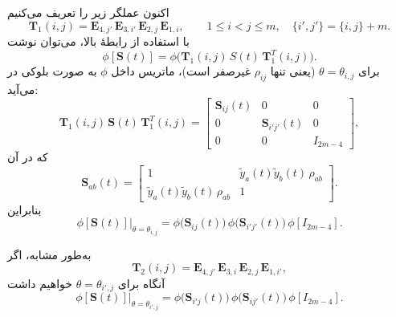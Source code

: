 \begin{اثبات}
	اکنون عملگر زیر را تعریف می‌کنیم
	\[
	\mathbf{T}_1(i,j)=\mathbf{E}_{4,j'}\,\mathbf{E}_{3,i'}\,\mathbf{E}_{2,j}\,\mathbf{E}_{1,i},\qquad 1\le i<j\le m,\quad
	\{i',j'\}=\{i,j\}+m.
	\]
	با استفاده از رابطهٔ بالا، می‌توان نوشت
	\begin{equation}
	\phi[\mathbf{S}(t)]=\phi\!\big(\mathbf{T}_1(i,j)\,S(t)\,\mathbf{T}_1^{T}(i,j)\big).
	\end{equation}
	برای \(\theta=\theta_{i,j}\) (یعنی تنها \(\rho_{ij}\) غیرصفر است)، ماتریس داخل \(\phi\) به صورت بلوکی در می‌آید:
	\begin{equation}
	\mathbf{T}_1(i,j)\,\mathbf{S}(t)\,\mathbf{T}_1^{T}(i,j)=
	\begin{bmatrix}
		\mathbf{S}_{ij}(t) & 0 & 0\\[2pt]
		0 & \mathbf{S}_{i'j'}(t) & 0\\[2pt]
		0 & 0 & I_{2m-4}
	\end{bmatrix},
	\end{equation}
	که در آن
	\begin{equation}
	\mathbf{S}_{ab}(t)=
	\begin{bmatrix}
		1 & \tilde y_a(t)\tilde y_b(t)\,\rho_{ab}\\[2pt]
		\tilde y_a(t)\tilde y_b(t)\,\rho_{ab} & 1
	\end{bmatrix}.
	\end{equation}
	بنابراین
	\begin{equation}
	\phi[\mathbf{S}(t)]\Big|_{\theta=\theta_{i,j}}
	=\phi\!\big(\mathbf{S}_{ij}(t)\big)\,\phi\!\big(\mathbf{S}_{i'j'}(t)\big)\,\phi[I_{2m-4}].
	\end{equation}
	
	به‌طور مشابه، اگر
	\[
	\mathbf{T}_2(i,j)=\mathbf{E}_{4,j'}\,\mathbf{E}_{3,i}\,\mathbf{E}_{2,j}\,\mathbf{E}_{1,i'},
	\]
	آنگاه برای \(\theta=\theta_{i',j}\) خواهیم داشت
	\begin{equation}
	\phi[\mathbf{S}(t)]\Big|_{\theta=\theta_{i',j}}
	=\phi\!\big(\mathbf{S}_{i'j}(t)\big)\,\phi\!\big(\mathbf{S}_{ij'}(t)\big)\,\phi[I_{2m-4}].
	\end{equation}
	

\end{اثبات}
